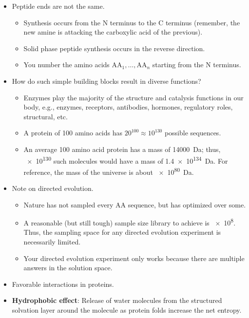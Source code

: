 \documentclass[../notes.tex]{subfiles}
\begin{document}
\begin{itemize}
\begin{itemize}
\begin{itemize}
        \end{itemize}
    \end{itemize}
    \item Peptide ends are not the same.
    \begin{itemize}
        \item Synthesis occurs from the N terminus to the C terminus (remember, the new amine is attacking the carboxylic acid of the previous).
        \item Solid phase peptide synthesis occurs in the reverse direction.
        \item You number the amino acids $\text{AA}_1,\dots,\text{AA}_n$ starting from the N terminus.
    \end{itemize}
    \item How do such simple building blocks result in diverse functions?
    \begin{itemize}
        \item Enzymes play the majority of the structure and catalysis functions in our body, e.g., enzymes, receptors, antibodies, hormones, regulatory roles, structural, etc.
        \item A protein of 100 amino acids has $20^{100}\approx 10^{130}$ possible sequences.
        \item An average 100 amino acid protein has a mass of \SI{14000}{\dalton}; thus, \num{e130} such molecules would have a mass of \SI{1.4e134}{\dalton}. For reference, the mass of the universe is about \SI{e80}{\dalton}.
    \end{itemize}
    \item Note on directed evolution.
    \begin{itemize}
        \item Nature has not sampled every AA sequence, but has optimized over some.
        \item A reasonable (but still tough) sample size library to achieve is \num{e8}. Thus, the sampling space for any directed evolution experiment is necessarily limited.
        \item Your directed evolution experiment only works because there are multiple answers in the solution space.
    \end{itemize}
    \item Favorable interactions in proteins.
    \item \textbf{Hydrophobic effect}: Release of water molecules from the structured solvation layer around the molecule as protein folds increase the net entropy.

\end{itemize}
\end{document}
